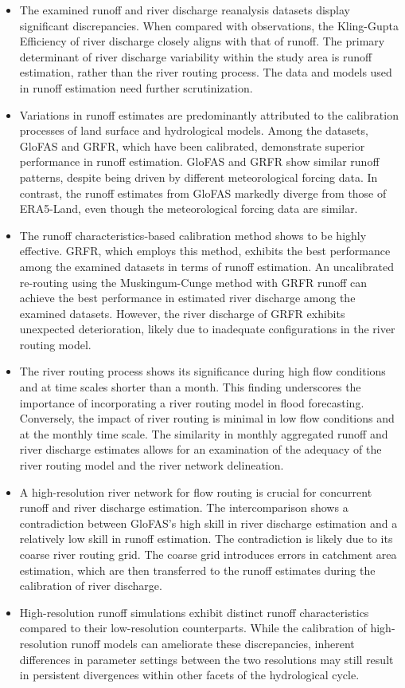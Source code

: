\documentclass[preprint, review, authoryear, longtitle, 12pt, 3p]{elsarticle}
\begin{document}
\begin{itemize}
  \item The examined runoff and river discharge reanalysis datasets display significant discrepancies. When compared with observations, the Kling-Gupta Efficiency of river discharge closely aligns with that of runoff. The primary determinant of river discharge variability within the study area is runoff estimation, rather than the river routing process. The data and models used in runoff estimation need further scrutinization.
  \item Variations in runoff estimates are predominantly attributed to the calibration processes of land surface and hydrological models. Among the datasets, GloFAS and GRFR, which have been calibrated, demonstrate superior performance in runoff estimation. GloFAS and GRFR show similar runoff patterns, despite being driven by different meteorological forcing data. In contrast, the runoff estimates from GloFAS markedly diverge from those of ERA5-Land, even though the meteorological forcing data are similar.
  \item The runoff characteristics-based calibration method shows to be highly effective. GRFR, which employs this method, exhibits the best performance among the examined datasets in terms of runoff estimation. An uncalibrated re-routing using the Muskingum-Cunge method with GRFR runoff can achieve the best performance in estimated river discharge among the examined datasets. However, the river discharge of GRFR exhibits unexpected deterioration, likely due to inadequate configurations in the river routing model.
  \item The river routing process shows its significance during high flow conditions and at time scales shorter than a month. This finding underscores the importance of incorporating a river routing model in flood forecasting. Conversely, the impact of river routing is minimal in low flow conditions and at the monthly time scale. The similarity in monthly aggregated runoff and river discharge estimates allows for an examination of the adequacy of the river routing model and the river network delineation.
  \item A high-resolution river network for flow routing is crucial for concurrent runoff and river discharge estimation. The intercomparison shows a contradiction between GloFAS's high skill in river discharge estimation and a relatively low skill in runoff estimation. The contradiction is likely due to its coarse river routing grid. The coarse grid introduces errors in catchment area estimation, which are then transferred to the runoff estimates during the calibration of river discharge.
  \item High-resolution runoff simulations exhibit distinct runoff characteristics compared to their low-resolution counterparts. While the calibration of high-resolution runoff models can ameliorate these discrepancies, inherent differences in parameter settings between the two resolutions may still result in persistent divergences within other facets of the hydrological cycle.
\end{itemize}
\end{document}
